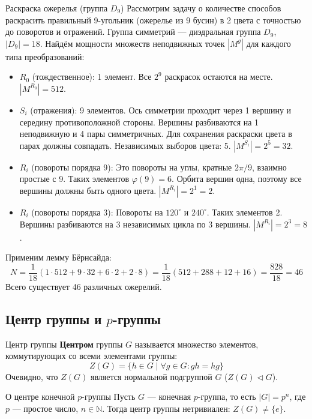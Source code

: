 \begin{Example}{Раскраска ожерелья (группа $D_9$)}{}
	Рассмотрим задачу о количестве способов раскрасить правильный 9-угольник (ожерелье из 9 бусин) в 2 цвета с точностью до поворотов и отражений. Группа симметрий — диэдральная группа $D_9$, $|D_9| = 18$.
	Найдём мощности множеств неподвижных точек $|M^g|$ для каждого типа преобразований:
	\begin{itemize}
		\item $R_0$ (тождественное): 1 элемент. Все $2^9$ раскрасок остаются на месте. $|M^{R_0}| = 512$.
		\item $S_i$ (отражения): 9 элементов. Ось симметрии проходит через 1 вершину и середину противоположной стороны. Вершины разбиваются на 1 неподвижную и 4 пары симметричных. Для сохранения раскраски цвета в парах должны совпадать. Независимых выборов цвета: 5. $|M^{S_i}| = 2^5 = 32$.
		\item $R_i$ (повороты порядка 9): Это повороты на углы, кратные $2\pi/9$, взаимно простые с 9. Таких элементов $\varphi(9) = 6$. Орбита вершин одна, поэтому все вершины должны быть одного цвета. $|M^{R_i}| = 2^1 = 2$.
		\item $R_i$ (повороты порядка 3): Повороты на $120^\circ$ и $240^\circ$. Таких элементов 2. Вершины разбиваются на 3 независимых цикла по 3 вершины. $|M^{R_i}| = 2^3 = 8$.
	\end{itemize}
	Применим лемму Бёрнсайда:
	\[ N = \frac{1}{18} (1 \cdot 512 + 9 \cdot 32 + 6 \cdot 2 + 2 \cdot 8) = \frac{1}{18} (512 + 288 + 12 + 16) = \frac{828}{18} = 46 \]
	Всего существует 46 различных ожерелий.
\end{Example}

\subsection{Центр группы и $p$-группы}

\begin{Definition}{Центр группы}{}
	\textbf{Центром} группы $G$ называется множество элементов, коммутирующих со всеми элементами группы:
	\[ Z(G) = \{h \in G \mid \forall g \in G \colon gh = hg\} \]
	Очевидно, что $Z(G)$ является нормальной подгруппой $G$ ($Z(G) \triangleleft G$).
\end{Definition}

\begin{Theorem}{О центре конечной $p$-группы}{}
	Пусть $G$ — конечная $p$-группа, то есть $|G| = p^n$, где $p$ — простое число, $n \in \mathbb{N}$. Тогда центр группы нетривиален: $Z(G) \neq \{e\}$.
\end{Theorem}

